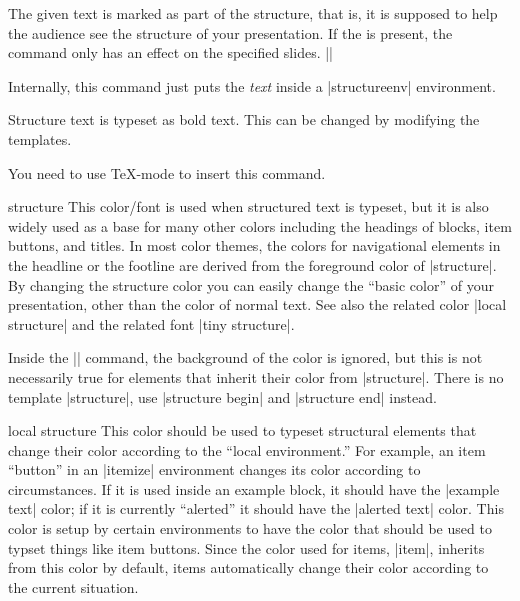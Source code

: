 \begin{command}{\structure{}}
  The given text is marked as part of the structure, that is, it is
  supposed to help the audience see the structure of your
  presentation. If the  is present, the
  command only has an effect on the specified slides.
  \example||

  Internally, this command just puts the \emph{text} inside a
  |structureenv| environment.

  \articlenote
  Structure text is typeset as bold text. This can be changed by
  modifying the templates.

  \lyxnote
  You need to use \TeX-mode to insert this command.

  \begin{element}{structure}\no\yes\yes
    This color/font is used when structured text is typeset, but it is
    also widely used as a base for many other colors including the
    headings of blocks, item buttons, and titles. In most color
    themes, the colors for navigational elements in the headline or
    the footline are derived from the foreground color of
    |structure|. By changing the structure color you can easily change
    the ``basic color'' of your presentation, other than the color of
    normal text. See also the related color |local structure| and the
    related font |tiny structure|.

    Inside the |\structure| command, the background of the color is
    ignored, but this is not necessarily true for elements that
    inherit their color from |structure|. There is no template
    |structure|, use |structure begin| and |structure end| instead.
  \end{element}

  \begin{element}{local structure}\no\yes\no
    This color should be used to typeset structural elements that change
    their color according to the ``local environment.'' For example, 
    an item ``button'' in an |itemize| environment changes its
    color according to circumstances. If it is used inside an example
    block, it should have the |example text| color; if it is currently
    ``alerted'' it should have the |alerted text| color. This color
    is setup by certain environments to have the color that should be
    used to typset things like item buttons. Since the color used for
    items, |item|, inherits from this color by default, items
    automatically change their color according to the current
    situation.


\end{element}
\end{command}

